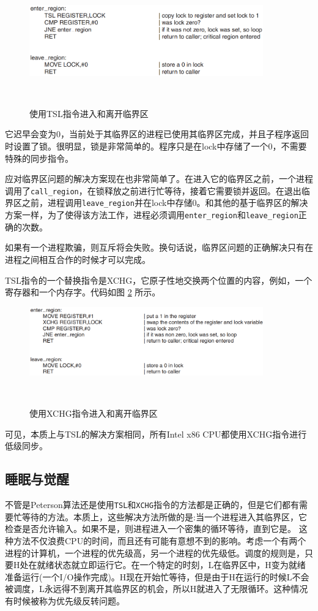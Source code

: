 	\begin{figure}[ht]\small
		\centering
		\includegraphics[width=0.90\textwidth]{FIG/2-25.png}
		\caption{使用TSL指令进入和离开临界区}　\label{fig:tsl}
	\end{figure}
	
	它迟早会变为0，当前处于其临界区的进程已使用其临界区完成，并且子程序返回时设置了锁。很明显，锁是非常简单的。程序只是在lock中存储了一个0，不需要特殊的同步指令。
	
	应对临界区问题的解决方案现在也非常简单了。在进入它的临界区之前，一个进程调用了\texttt{call\_region}，在锁释放之前进行忙等待，接着它需要锁并返回。在退出临界区之前，进程调用\texttt{leave\_region}并在lock中存储0。和其他的基于临界区的解决方案一样，为了使得该方法工作，进程必须调用\texttt{enter\_region}和\texttt{leave\_region}正确的次数。
	
	如果有一个进程欺骗，则互斥将会失败。换句话说，临界区问题的正确解决只有在进程之间相互合作的时候才可以完成。
	
	TSL指令的一个替换指令是XCHG，它原子性地交换两个位置的内容，例如，一个寄存器和一个内存字。代码如图 \ref{fig:xchg} 所示。
	
	\begin{figure}[ht]\small
		\centering
		\includegraphics[width=0.90\textwidth]{FIG/2-26.png}
		\caption{使用XCHG指令进入和离开临界区}　\label{fig:xchg}
	\end{figure}

	可见，本质上与TSL的解决方案相同，所有Intel x86 CPU都使用XCHG指令进行低级同步。

	\subsection{睡眠与觉醒}
	
	不管是Peterson算法还是使用\texttt{TSL}和\texttt{XCHG}指令的方法都是正确的，但是它们都有需要忙等待的方法。本质上，这些解决方法所做的是:当一个进程进入其临界区，它检查是否允许输入。如果不是，则进程进入一个密集的循环等待，直到它是。
	这种方法不仅浪费CPU的时间，而且还有可能有意想不到的影响。考虑一个有两个进程的计算机，一个进程的优先级高，另一个进程的优先级低。调度的规则是，只要H处在就绪状态就立即运行它。在一个特定的时刻，L在临界区中，H变为就绪准备运行(一个I/O操作完成)。H现在开始忙等待，但是由于H在运行的时候L不会被调度，L永远得不到离开其临界区的机会，所以H就进入了无限循环。这种情况有时候被称为优先级反转问题。
	
